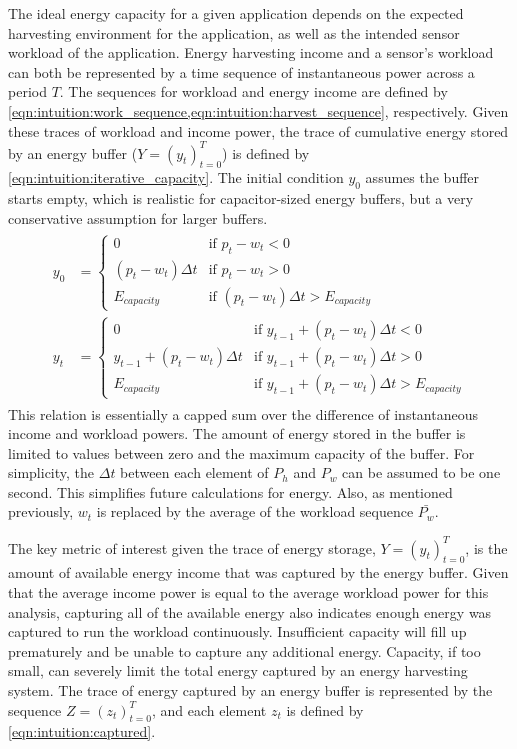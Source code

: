 The ideal energy capacity for a given application depends on the 
expected harvesting environment for the application,
as well as the 
intended sensor workload of the application. 
Energy harvesting income and a sensor's workload can both be represented by a time sequence of instantaneous power across a period $T$.
The sequences for workload and energy income are defined by \cref{eqn:intuition:work_sequence,eqn:intuition:harvest_sequence}, respectively.
Given these traces of workload and income power, the trace of cumulative energy stored by an energy buffer ($Y = (y_t)^T_{t=0}$) is defined by \cref{eqn:intuition:iterative_capacity}. The initial condition $y_0$ assumes the buffer starts empty, which is realistic for capacitor-sized energy buffers, but a very conservative assumption for larger buffers. 
\begin{align}
\begin{split}
    y_0 &= \begin{cases} 
        0                       & \text{if $p_t - w_t < 0$} \\
        (p_t - w_t) \Delta t    & \text{if $p_t - w_t > 0$} \\
        E_{capacity}            & \text{if $(p_t - w_t) \Delta t > E_{capacity}$}
    \end{cases} \\
    y_t &= \begin{cases} 
        0                               & \text{if $y_{t-1} + (p_t - w_t) \Delta t < 0$} \\
        y_{t-1} + (p_t - w_t) \Delta t  & \text{if $y_{t-1} + (p_t - w_t) \Delta t > 0$} \\
        E_{capacity}                    & \text{if $y_{t-1} + (p_t - w_t) \Delta t > E_{capacity}$}
    \end{cases}
    \end{split} \label{eqn:intuition:iterative_capacity} 
\end{align}
This relation is essentially a capped sum over the difference of instantaneous income and workload powers. The amount of energy stored in the buffer is limited to values between zero and the maximum capacity of the buffer. 
For simplicity, the $\Delta t$ between each element of $P_h$ and $P_w$ can be assumed to be one second. This simplifies future calculations for energy. Also, as mentioned previously, $w_t$ is replaced by the average of the workload sequence $\bar{P_w}$.

The key metric of interest given the trace of energy storage, $Y = (y_t)_{t=0}^T$, is  
the amount of available energy income that was captured by the energy buffer. 
Given that the average income power is equal to the average workload power for this analysis, capturing all of the available energy also indicates enough energy was captured to run the workload continuously. 
Insufficient capacity will fill up prematurely and be unable to capture any additional energy. 
Capacity, if too small, can severely limit the total energy captured by an energy harvesting system.
The trace of energy captured by an energy buffer is represented by the sequence $Z = (z_t)^T_{t=0}$, and each element $z_t$ is defined by \cref{eqn:intuition:captured}.

